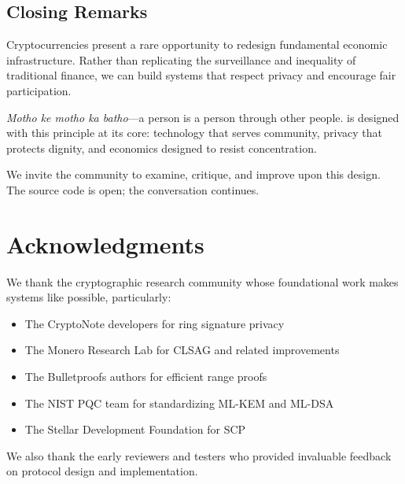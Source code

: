 \subsection{Closing Remarks}

Cryptocurrencies present a rare opportunity to redesign fundamental
economic infrastructure. Rather than replicating the surveillance and
inequality of traditional finance, we can build systems that respect
privacy and encourage fair participation.

\textit{Motho ke motho ka batho}---a person is a person through other
people. \Botho is designed with this principle at its core: technology
that serves community, privacy that protects dignity, and economics
designed to resist concentration.

We invite the community to examine, critique, and improve upon this
design. The source code is open; the conversation continues.

\section*{Acknowledgments}

We thank the cryptographic research community whose foundational work
makes systems like \Botho possible, particularly:

\begin{itemize}
  \item The CryptoNote developers for ring signature privacy
  \item The Monero Research Lab for CLSAG and related improvements
  \item The Bulletproofs authors for efficient range proofs
  \item The NIST PQC team for standardizing ML-KEM and ML-DSA
  \item The Stellar Development Foundation for SCP
\end{itemize}

We also thank the early reviewers and testers who provided invaluable
feedback on protocol design and implementation.

